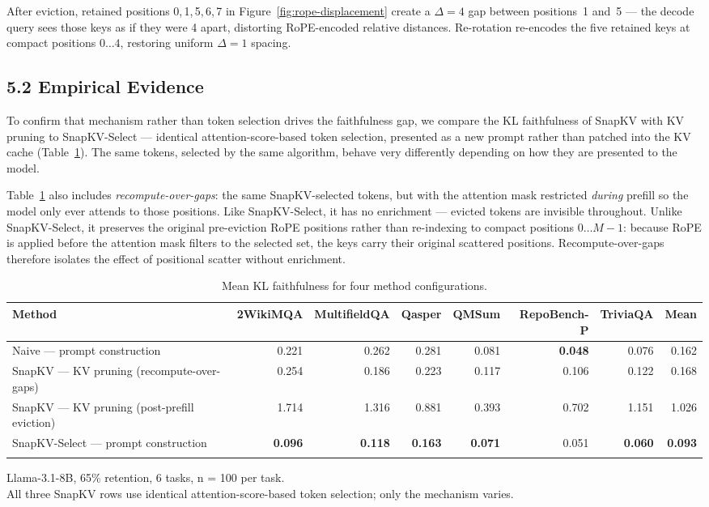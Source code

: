 \documentclass[10pt,letterpaper]{article}
\begin{document}
After eviction, retained positions 0,\,1,\,5,\,6,\,7 in
Figure~\ref{fig:rope-displacement} create a $\Delta\!=\!4$ gap between
positions~1 and~5 --- the decode query sees those keys as if they were
4 apart, distorting RoPE-encoded relative distances. Re-rotation
re-encodes the five retained keys at compact positions $0\ldots4$,
restoring uniform $\Delta\!=\!1$ spacing.
\hypertarget{empirical-evidence}{%
\subsection{5.2 Empirical Evidence}\label{empirical-evidence}}

To confirm that mechanism rather than token selection drives the
faithfulness gap, we compare the KL faithfulness of SnapKV with KV pruning to SnapKV-Select ---
identical attention-score-based token selection, presented as a new
prompt rather than patched into the KV cache (Table~\ref{tab:t1}). The same tokens,
selected by the same algorithm, behave very differently depending on how
they are presented to the model. 

Table~\ref{tab:t1} also includes \emph{recompute-over-gaps}: the same
SnapKV-selected tokens, but with the attention mask restricted
\emph{during} prefill so the model only ever attends to those positions.
Like SnapKV-Select, it has no enrichment --- evicted tokens are
invisible throughout. Unlike SnapKV-Select, it preserves the original
pre-eviction RoPE positions rather than re-indexing to compact positions
$0\ldots M-1$: because RoPE is applied before the attention mask
filters to the selected set, the keys carry their original scattered
positions. Recompute-over-gaps therefore isolates the effect of
positional scatter without enrichment.
\begin{table}[H]
\centering
\small
\caption{Mean KL faithfulness for four method configurations.}
\label{tab:t1}
\begin{tabular}{@{}>{\raggedright\arraybackslash}p{}rrrrrrr@{}}
\toprule
Method & 2WikiMQA & MultifieldQA & Qasper & QMSum & RepoBench-P & TriviaQA & Mean\\
\midrule
Naive --- prompt construction & 0.221 & 0.262 & 0.281 & 0.081 & \textbf{0.048} & 0.076 & 0.162\\
SnapKV --- KV pruning (recompute-over-gaps) & 0.254 & 0.186 & 0.223 & 0.117 & 0.106 & 0.122 & 0.168\\
SnapKV --- KV pruning (post-prefill eviction) & 1.714 & 1.316 & 0.881 & 0.393 & 0.702 & 1.151 & 1.026\\
SnapKV-Select --- prompt construction & \textbf{0.096} & \textbf{0.118} & \textbf{0.163} & \textbf{0.071} & 0.051 & \textbf{0.060} & \textbf{0.093}\\
\bottomrule
\\
\end{tabular}
Llama-3.1-8B, 65\% retention, 6 tasks, n = 100 per task.\\All three
SnapKV rows use identical attention-score-based token selection; only
the mechanism varies.
\end{table}
\end{document}
